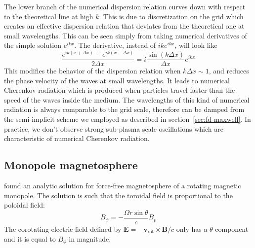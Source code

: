 The lower branch of the numerical dispersion relation curves down with
respect to the theoretical line at high $k$. This is due to discretization on the
grid which creates an effective dispersion relation that deviates from
the theoretical one at small wavelengths. This can be seen simply from taking numerical derivatives of the simple solution $e^{ikx}$. The derivative, instead of $ike^{ikx}$, will look like
\begin{equation}
    \frac{e^{ik(x+\Delta x)} - e^{ik(x-\Delta x)}}{2\Delta x} = i\frac{\sin(k\Delta x)}{\Delta x} e^{ikx}
\end{equation}
This modifies the behavior of the dispersion relation when $k\Delta x \sim 1$,
and reduces the phase velocity of the waves at small wavelengths. It leads to
numerical Cherenkov radiation which is produced when particles travel faster
than the speed of the waves inside the medium. The wavelengths of this kind of
numerical radiation is always comparable to the grid scale, therefore can be
damped from the semi-implicit scheme we employed as described in
section~\ref{sec:fd-maxwell}. In practice, we don't observe strong sub-plasma
scale oscillations which are characteristic of numerical Cherenkov radiation.


\subsection{Monopole magnetosphere}
\label{sec:test-monopole}

\citet{michel_rotating_1973} found an analytic solution for force-free
magnetosphere of a rotating magnetic monopole. The solution is such that the
toroidal field is proportional to the poloidal field:
\begin{equation}
  \label{eq:monopole-toroidal}
  B_{\phi} = -\frac{\Omega r\sin\theta}{c} B_{p}
\end{equation}
The corotating electric field defined by $\mathbf{E} =
-\mathbf{v}_\mathrm{rot}\times \mathbf{B}/c$ only has a $\theta$ component and it
is equal to $B_{\phi}$ in magnitude.


